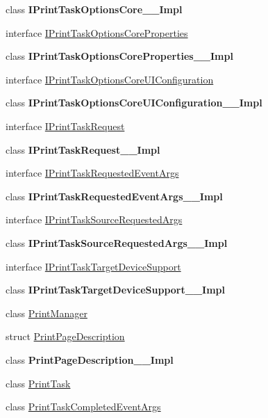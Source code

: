 \begin{DoxyCompactItemize}
\item 
class {\bfseries I\+Print\+Task\+Options\+Core\+\_\+\+\_\+\+Impl}
\item 
interface \hyperlink{interface_windows_1_1_graphics_1_1_printing_1_1_i_print_task_options_core_properties}{I\+Print\+Task\+Options\+Core\+Properties}
\item 
class {\bfseries I\+Print\+Task\+Options\+Core\+Properties\+\_\+\+\_\+\+Impl}
\item 
interface \hyperlink{interface_windows_1_1_graphics_1_1_printing_1_1_i_print_task_options_core_u_i_configuration}{I\+Print\+Task\+Options\+Core\+U\+I\+Configuration}
\item 
class {\bfseries I\+Print\+Task\+Options\+Core\+U\+I\+Configuration\+\_\+\+\_\+\+Impl}
\item 
interface \hyperlink{interface_windows_1_1_graphics_1_1_printing_1_1_i_print_task_request}{I\+Print\+Task\+Request}
\item 
class {\bfseries I\+Print\+Task\+Request\+\_\+\+\_\+\+Impl}
\item 
interface \hyperlink{interface_windows_1_1_graphics_1_1_printing_1_1_i_print_task_requested_event_args}{I\+Print\+Task\+Requested\+Event\+Args}
\item 
class {\bfseries I\+Print\+Task\+Requested\+Event\+Args\+\_\+\+\_\+\+Impl}
\item 
interface \hyperlink{interface_windows_1_1_graphics_1_1_printing_1_1_i_print_task_source_requested_args}{I\+Print\+Task\+Source\+Requested\+Args}
\item 
class {\bfseries I\+Print\+Task\+Source\+Requested\+Args\+\_\+\+\_\+\+Impl}
\item 
interface \hyperlink{interface_windows_1_1_graphics_1_1_printing_1_1_i_print_task_target_device_support}{I\+Print\+Task\+Target\+Device\+Support}
\item 
class {\bfseries I\+Print\+Task\+Target\+Device\+Support\+\_\+\+\_\+\+Impl}
\item 
class \hyperlink{class_windows_1_1_graphics_1_1_printing_1_1_print_manager}{Print\+Manager}
\item 
struct \hyperlink{struct_windows_1_1_graphics_1_1_printing_1_1_print_page_description}{Print\+Page\+Description}
\item 
class {\bfseries Print\+Page\+Description\+\_\+\+\_\+\+Impl}
\item 
class \hyperlink{class_windows_1_1_graphics_1_1_printing_1_1_print_task}{Print\+Task}
\item 
class \hyperlink{class_windows_1_1_graphics_1_1_printing_1_1_print_task_completed_event_args}{Print\+Task\+Completed\+Event\+Args}

\end{DoxyCompactItemize}
